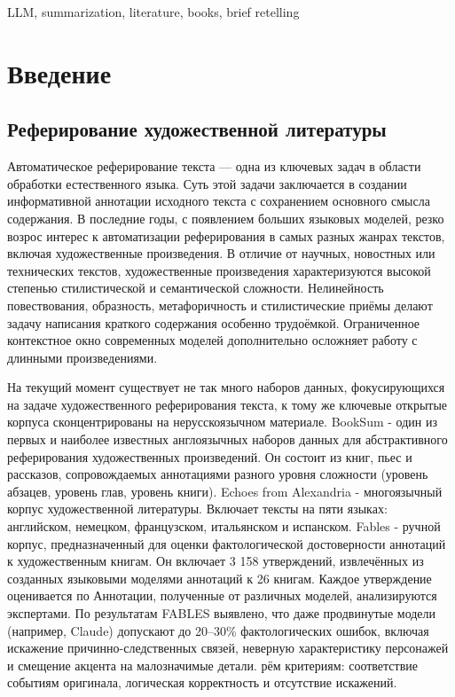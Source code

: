 \documentclass{article}
\begin{document}
\begin{altkeywords}
LLM, summarization, literature, books, brief retelling
\end{altkeywords}


\section*{Введение}
\subsection*{Реферирование художественной литературы}
Автоматическое реферирование текста — одна из ключевых задач в области обработки естественного языка. Суть этой задачи заключается в создании информативной аннотации исходного текста с сохранением основного смысла содержания. 
В последние годы, с появлением больших языковых моделей, резко возрос интерес к автоматизации реферирования в самых разных жанрах текстов, включая художественные произведения. 
В отличие от научных, новостных или технических текстов, художественные произведения характеризуются высокой степенью стилистической и семантической сложности. 
Нелинейность повествования, образность, метафоричность и стилистические приёмы делают задачу написания краткого содержания особенно трудоёмкой. 
Ограниченное контекстное окно современных моделей дополнительно осложняет работу с длинными произведениями.

На текущий момент существует не так много наборов данных, фокусирующихся на задаче художественного реферирования текста, 
к тому же ключевые открытые корпуса сконцентрированы на нерусскоязычном материале. BookSum \cite{BookSum} - один из первых и наиболее известных англоязычных наборов данных
для абстрактивного реферирования художественных произведений. Он состоит из книг, пьес и рассказов, сопровождаемых аннотациями разного уровня сложности (уровень абзацев, 
уровень глав, уровень книги). 
Echoes from Alexandria \cite{alexandria} - многоязычный корпус художественной литературы. Включает тексты на пяти языках: английском, немецком, французском, итальянском и испанском.
Fables \cite{fables} - ручной корпус, предназначенный для оценки фактологической достоверности аннотаций к художественным книгам. 
Он включает 3 158 утверждений, извлечённых из созданных языковыми моделями аннотаций к 26 книгам.
Каждое утверждение оценивается по Аннотации, полученные от различных моделей, анализируются экспертами. По
результатам FABLES выявлено, что даже продвинутые модели (например, Claude) допускают до 20–30\% фактологических ошибок, включая искажение
причинно-следственных связей, неверную характеристику персонажей и смещение
акцента на малозначимые детали.
рём критериям: соответствие событиям оригинала, логическая корректность и отсутствие искажений.
\end{document}

